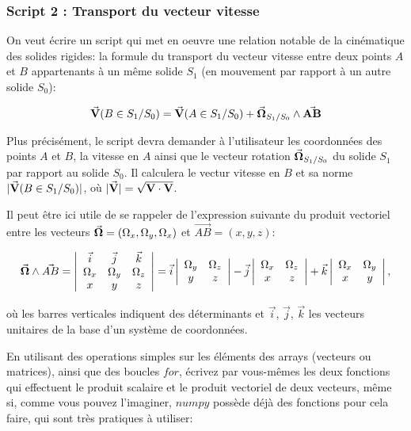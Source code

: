 \documentclass{article}
\begin{document}
    \subsubsection{Script 2 : Transport du vecteur vitesse}


    On veut écrire un script qui met en oeuvre une relation notable de la
cinématique des solides rigides: la formule du transport du vecteur
vitesse entre deux points \(A\) et \(B\) appartenants à un même solide
\(S_1\) (en mouvement par rapport à un autre solide \(S_0\)):

    \[\vec{\bf V}(B \in S_1/S_0) = \vec{\bf V}(A \in S_1/S_0) + \vec{\bf \Omega}_{S_1/S_0} \wedge \vec{\bf AB}\]

    Plus précisément, le script devra demander à l'utilisateur les
coordonnées des points \(A\) et \(B\), la vitesse en \(A\) ainsi que le
vecteur rotation \(\vec{\bf \Omega}_{S_1/S_0}\) du solide \(S_1\) par
rapport au solide \(S_0\). Il calculera le vectur vitesse en \(B\) et sa
norme \(|\vec{\bf V}(B \in S_1/S_0)|\), où
\(|\vec{\bf V}|=\sqrt{{\bf V}\cdot{\bf V}}\).

    Il peut être ici utile de se rappeler de l'expression suivante du
produit vectoriel entre les vecteurs
\(\vec{\bf{\Omega}}=(\Omega_x,\Omega_y,\Omega_x)\) et
\(\vec{AB}=(x,y,z)\):

\[
\vec{\bf{\Omega}} \wedge \vec{AB}=
\left| \begin{array}{ccc}
\vec{i} & \vec{j} & \vec{k}  \\
\Omega_x & \Omega_y & \Omega_z \\
x & y & z
\end{array} \right| = 
\vec{i} \left| \begin{array}{cc}
\Omega_y & \Omega_z \\
y & z
\end{array}
\right| - 
\vec{j} \left| \begin{array}{cc}
\Omega_x & \Omega_z \\
x & z
\end{array}
\right| + 
\vec{k} \left| \begin{array}{cc}
\Omega_x & \Omega_y \\
x & y
\end{array}
\right|,
\]

où les barres verticales indiquent des déterminants et \(\vec{i}\),
\(\vec{j}\), \(\vec{k}\) les vecteurs unitaires de la base d'un système
de coordonnées.

    En utilisant des operations simples sur les éléments des arrays
(vecteurs ou matrices), ainsi que des boucles \(for\), écrivez par
vous-mêmes les deux fonctions qui effectuent le produit scalaire et le
produit vectoriel de deux vecteurs, même si, comme vous pouvez
l'imaginer, \(numpy\) possède déjà des fonctions pour cela faire, qui
sont très pratiques à utiliser:
\end{document}
